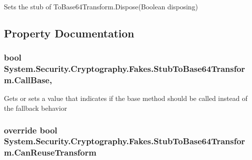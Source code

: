 Sets the stub of To\-Base64\-Transform.\-Dispose(\-Boolean disposing)



\subsection{Property Documentation}
\hypertarget{class_system_1_1_security_1_1_cryptography_1_1_fakes_1_1_stub_to_base64_transform_a846392a45174c93bb6aec81f8bca1aac}{
\subsubsection[{Call\-Base}]{\setlength{\rightskip}{0pt plus 5cm}bool System.\-Security.\-Cryptography.\-Fakes.\-Stub\-To\-Base64\-Transform.\-Call\-Base\hspace{0.3cm}{\ttfamily [get]}, {\ttfamily [set]}}}\label{class_system_1_1_security_1_1_cryptography_1_1_fakes_1_1_stub_to_base64_transform_a846392a45174c93bb6aec81f8bca1aac}


Gets or sets a value that indicates if the base method should be called instead of the fallback behavior

\hypertarget{class_system_1_1_security_1_1_cryptography_1_1_fakes_1_1_stub_to_base64_transform_a55772ee564cb90d424f10651634bdba3}{
\subsubsection[{Can\-Reuse\-Transform}]{\setlength{\rightskip}{0pt plus 5cm}override bool System.\-Security.\-Cryptography.\-Fakes.\-Stub\-To\-Base64\-Transform.\-Can\-Reuse\-Transform\hspace{0.3cm}{\ttfamily [get]}}}\label{class_system_1_1_security_1_1_cryptography_1_1_fakes_1_1_stub_to_base64_transform_a55772ee564cb90d424f10651634bdba3}


